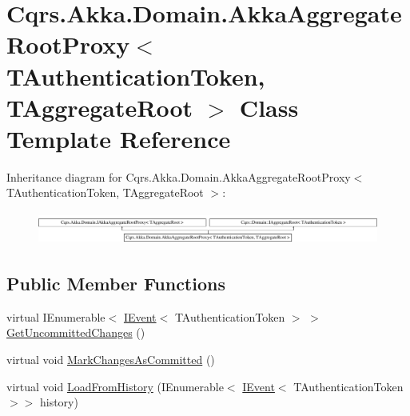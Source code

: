 \hypertarget{classCqrs_1_1Akka_1_1Domain_1_1AkkaAggregateRootProxy}{}\section{Cqrs.\+Akka.\+Domain.\+Akka\+Aggregate\+Root\+Proxy$<$ T\+Authentication\+Token, T\+Aggregate\+Root $>$ Class Template Reference}
\label{classCqrs_1_1Akka_1_1Domain_1_1AkkaAggregateRootProxy}
Inheritance diagram for Cqrs.\+Akka.\+Domain.\+Akka\+Aggregate\+Root\+Proxy$<$ T\+Authentication\+Token, T\+Aggregate\+Root $>$\+:\begin{figure}[H]
\begin{center}
\leavevmode
\includegraphics[height=1.081081cm]{classCqrs_1_1Akka_1_1Domain_1_1AkkaAggregateRootProxy}
\end{center}
\end{figure}
\subsection*{Public Member Functions}
\begin{DoxyCompactItemize}
\item 
virtual I\+Enumerable$<$ \hyperlink{interfaceCqrs_1_1Events_1_1IEvent}{I\+Event}$<$ T\+Authentication\+Token $>$ $>$ \hyperlink{classCqrs_1_1Akka_1_1Domain_1_1AkkaAggregateRootProxy_afa620ced4762b0539da23ca063fed489}{Get\+Uncommitted\+Changes} ()
\item 
virtual void \hyperlink{classCqrs_1_1Akka_1_1Domain_1_1AkkaAggregateRootProxy_aaa8a46fee21b6133ae4d1b2f60983d7e}{Mark\+Changes\+As\+Committed} ()
\item 
virtual void \hyperlink{classCqrs_1_1Akka_1_1Domain_1_1AkkaAggregateRootProxy_ae611077a51a215aef7fd0e106734b386}{Load\+From\+History} (I\+Enumerable$<$ \hyperlink{interfaceCqrs_1_1Events_1_1IEvent}{I\+Event}$<$ T\+Authentication\+Token $>$$>$ history)
\end{DoxyCompactItemize}
